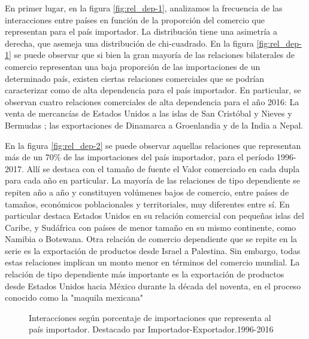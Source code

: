 \documentclass[class=article, crop=false]{standalone}
\begin{document}
En primer lugar, en la figura \ref{fig:rel_dep-1}, analizamos la frecuencia de las interacciones entre países en función de la proporción del comercio que representan para el país importador. La distribución tiene una asimetría a derecha, que asemeja una distribución de chi-cuadrado. En la figura \ref{fig:rel_dep-1} se puede observar que si bien la gran mayoría de las relaciones bilaterales de comercio representan una baja proporción de las importaciones de un determinado país, existen ciertas relaciones comerciales que se podrían caracterizar como de alta dependencia para el país importador. 
En particular, se observan cuatro relaciones comerciales de alta dependencia para el año 2016: La venta de mercancías de Estados Unidos a las islas de San Cristóbal y Nieves y Bermudas ; las exportaciones de Dinamarca a Groenlandia y de la India a Nepal. 

En la figura \ref{fig:rel_dep-2} se puede observar aquellas relaciones que representan más de un 70\% de las importaciones del país importador, para el período 1996-2017. Allí se destaca con el tamaño de fuente el Valor comerciado en cada dupla para cada año en particular. La mayoría de las relaciones de tipo dependiente se repiten año a año y constituyen volúmenes bajos de comercio, entre países de tamaños, económicos poblacionales y territoriales, muy diferentes entre sí. En particular destaca Estados Unidos en su relación comercial con pequeñas islas del Caribe, y Sudáfrica con países de menor tamaño en su mismo continente, como Namibia o Botswana. Otra relación de comercio dependiente que se repite en la serie es la exportación de productos desde Israel a Palestina. Sin embargo, todas estas relaciones implican un monto menor en términos del comercio mundial. La relación de tipo dependiente más importante es la exportación de productos desde Estados Unidos hacia México durante la década del noventa, en el proceso conocido como la "maquila mexicana" \citep{carrillo1998third}


\begin{figure}
	\centering
	\caption{Interacciones según porcentaje de importaciones que representa al país importador. Destacado par Importador-Exportador.1996-2016}
	\label{fig:rel_dep}
\end{figure}
\end{document}
